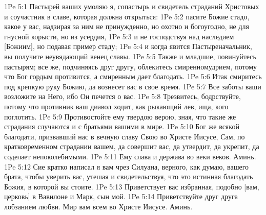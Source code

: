 1Pe 5:1  Пастырей ваших умоляю я, сопастырь и свидетель страданий Христовых и соучастник в славе, которая должна открыться:
1Pe 5:2  пасите Божие стадо, какое у вас, надзирая за ним не принужденно, но охотно и богоугодно, не для гнусной корысти, но из усердия,
1Pe 5:3  и не господствуя над наследием [Божиим], но подавая пример стаду;
1Pe 5:4  и когда явится Пастыреначальник, вы получите неувядающий венец славы.
1Pe 5:5  Также и младшие, повинуйтесь пастырям; все же, подчиняясь друг другу, облекитесь смиренномудрием, потому что Бог гордым противится, а смиренным дает благодать.
1Pe 5:6  Итак смиритесь под крепкую руку Божию, да вознесет вас в свое время.
1Pe 5:7  Все заботы ваши возложите на Него, ибо Он печется о вас.
1Pe 5:8  Трезвитесь, бодрствуйте, потому что противник ваш диавол ходит, как рыкающий лев, ища, кого поглотить.
1Pe 5:9  Противостойте ему твердою верою, зная, что такие же страдания случаются и с братьями вашими в мире.
1Pe 5:10  Бог же всякой благодати, призвавший нас в вечную славу Свою во Христе Иисусе, Сам, по кратковременном страдании вашем, да совершит вас, да утвердит, да укрепит, да соделает непоколебимыми.
1Pe 5:11  Ему слава и держава во веки веков. Аминь.
1Pe 5:12  Сие кратко написал я вам чрез Силуана, верного, как думаю, вашего брата, чтобы уверить вас, утешая и свидетельствуя, что это истинная благодать Божия, в которой вы стоите.
1Pe 5:13  Приветствует вас избранная, подобно [вам, церковь] в Вавилоне и Марк, сын мой.
1Pe 5:14  Приветствуйте друг друга лобзанием любви. Мир вам всем во Христе Иисусе. Аминь.


